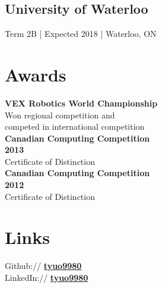 \documentclass[]{peter_resume}
\begin{document}
\begin{minipage}[t]{0.33\textwidth}
\subsection{University of Waterloo}
Term 2B | Expected 2018 | Waterloo, ON
\sectionsep


\section{Awards} 
\textbf {VEX Robotics World Championship}\\
Won regional competition and\\
competed in international competition\\
\vspace{0.1cm}
\textbf {Canadian Computing Competition\\ 2013}\\
Certificate of Distinction\\
\vspace{0.1cm}
\textbf {Canadian Computing Competition\\ 2012}\\
Certificate of Distinction\\
\sectionsep







\vspace{3.05cm}

\section{Links} 
Github:// \href{https://github.com/tyuo9980}{\bf tyuo9980} \\
LinkedIn://  \href{https://www.linkedin.com/in/tyuo9980}{\bf tyuo9980} \\
\sectionsep


\end{minipage}
\end{document}
